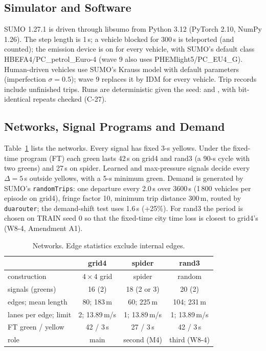 \subsection{Simulator and Software}
SUMO 1.27.1 \cite{lopez2018} is driven through libsumo from Python 3.12 (PyTorch 2.10, NumPy 1.26). The step length is 1\,s; a vehicle
blocked for 300\,s is teleported (and counted); the emission device is on for every vehicle, with SUMO's default class
HBEFA4/PC\_petrol\_Euro-4 \cite{krajzewicz2015} (wave 9 also uses PHEMlight5/PC\_EU4\_G). Human-driven vehicles use SUMO's Krauss model
\cite{krauss1998} with default parameters (imperfection $\sigma=0.5$); wave 9 replaces it by IDM \cite{treiber2000} for every vehicle.
Trip records include unfinished trips. Runs are deterministic given the seed:  and , with
bit-identical repeats checked (C-27).

\subsection{Networks, Signal Programs and Demand}
Table~\ref{tab:nets} lists the networks. Every signal has fixed 3-s yellows. Under the fixed-time program (FT) each green lasts 42\,s on
grid4 and rand3 (a 90-s cycle with two greens) and 27\,s on spider. Learned and max-pressure signals decide every $\Delta=5$\,s outside
yellows, with a 5-s minimum green. Demand is generated by SUMO's \texttt{randomTrips}: one departure every 2.0\,s over 3600\,s (1\,800
vehicles per episode on grid4), fringe factor 10, minimum trip distance 300\,m, routed by \texttt{duarouter}; the demand-shift test uses
1.6\,s (+25\%). For rand3 the period is chosen on TRAIN seed 0 so that the fixed-time city time loss is closest to grid4's (W8-4,
Amendment A1).
\begin{table}[t]\centering\footnotesize\setlength{\tabcolsep}{3pt}
\caption{Networks. Edge statistics exclude internal edges.}\label{tab:nets}\scriptsize
\begin{tabular}{@{}lccc@{}}\toprule
 & grid4 & spider & rand3\\\midrule
construction & $4\times4$ grid & spider & random\\
signals (greens) & 16 (2) & 18 (2 or 3) & 20 (2)\\
edges; mean length & 80; 183\,m & 60; 225\,m & 104; 231\,m\\
lanes per edge; limit & 2; 13.89\,m/s & 1; 13.89\,m/s & 1; 13.89\,m/s\\
FT green / yellow & 42 / 3\,s & 27 / 3\,s & 42 / 3\,s\\
role & main & second (M4) & third (W8-4)\\\bottomrule
\end{tabular}\end{table}

